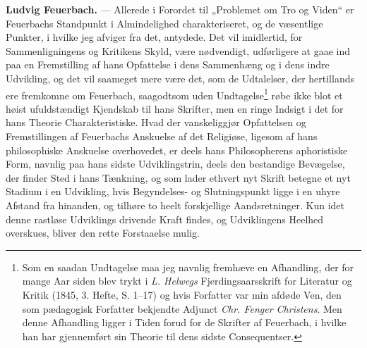 \textbf{Ludvig Feuerbach.} --- Allerede i Forordet til „Problemet om Tro og
Viden“ er Feuerbachs Standpunkt i Almindelighed charakteriseret, og de
væsentlige Punkter, i hvilke jeg afviger fra det, antydede. Det vil
imidlertid, for Sammenligningens og Kritikens Skyld, være nødvendigt,
udførligere at gaae ind paa en Fremstilling af hans Opfattelse i dens
Sammenhæng og i dens indre Udvikling, og det vil saameget mere være det, som de
Udtalelser, der hertillands ere fremkomne om Feuerbach, saagodtsom uden
Undtagelse\footnote{Som en saadan Undtagelse maa jeg navnlig fremhæve en
Afhandling, der for mange Aar siden blev trykt i \emph{L. Helwegs}
Fjerdingsaarsskrift for Literatur og Kritik (1845, 3. Hefte, S. 1--17) og hvis
Forfatter var min afdøde Ven, den som pædagogisk Forfatter bekjendte Adjunct
\emph{Chr. Fenger Christens}. Men denne Afhandling ligger i Tiden forud for de
Skrifter af Feuerbach, i hvilke han har gjennemført sin Theorie til dens sidste
Consequentser.} røbe ikke blot et høist ufuldstændigt Kjendskab til hans
Skrifter, men en ringe Indsigt i det for hans Theorie Charakteristiske.
 Hvad der vanskeliggjør Opfattelsen og Fremstillingen af Feuerbachs Anskuelse af
det Religiøse, ligesom af hans philosophiske Anskuelse overhovedet, er deels
hans Philosopherens aphoristiske Form, navnlig paa hans sidste
Udviklingstrin, deels den bestandige Bevægelse, der finder Sted i hans
Tænkning, og som lader ethvert nyt Skrift betegne et nyt Stadium i en
Udvikling, hvis Begyndelses- og Slutningspunkt ligge i en uhyre Afstand fra
hinanden, og tilhøre to heelt forskjellige Aandsretninger. Kun idet denne
rastløse Udviklings drivende Kraft findes, og Udviklingens Heelhed overskues,
bliver den rette Forstaaelse mulig.

